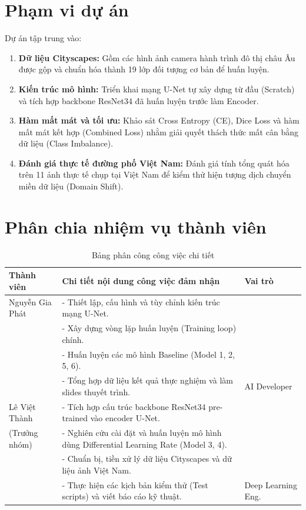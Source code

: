 \documentclass[a4paper,12pt]{report}
\begin{document}
\section{Phạm vi dự án}
Dự án tập trung vào:
\begin{enumerate}
    \item \textbf{Dữ liệu Cityscapes:} Gồm các hình ảnh camera hành trình đô thị châu Âu được gộp và chuẩn hóa thành 19 lớp đối tượng cơ bản để huấn luyện.
    \item \textbf{Kiến trúc mô hình:} Triển khai mạng U-Net tự xây dựng từ đầu (Scratch) và tích hợp backbone ResNet34 đã huấn luyện trước làm Encoder.
    \item \textbf{Hàm mất mát và tối ưu:} Khảo sát Cross Entropy (CE), Dice Loss và hàm mất mát kết hợp (Combined Loss) nhằm giải quyết thách thức mất cân bằng dữ liệu (Class Imbalance).
    \item \textbf{Đánh giá thực tế đường phố Việt Nam:} Đánh giá tính tổng quát hóa trên 11 ảnh thực tế chụp tại Việt Nam để kiểm thử hiện tượng dịch chuyển miền dữ liệu (Domain Shift).
\end{enumerate}

\section{Phân chia nhiệm vụ thành viên}
\begin{table}[H]
\centering
\caption{Bảng phân công công việc chi tiết}
\label{tab:task_assignment}
\small
\begin{tabularx}{\textwidth}{l p{8.5cm} l}
\toprule
\textbf{Thành viên} & \textbf{Chi tiết nội dung công việc đảm nhận} & \textbf{Vai trò} \\
\midrule
Nguyễn Gia Phát & - Thiết lập, cấu hình và tùy chỉnh kiến trúc mạng U-Net.\\
 & - Xây dựng vòng lặp huấn luyện (Training loop) chính.\\
 & - Huấn luyện các mô hình Baseline (Model 1, 2, 5, 6).\\
 & - Tổng hợp dữ liệu kết quả thực nghiệm và làm slides thuyết trình. & AI Developer \\
\midrule
Lê Việt Thành & - Tích hợp cấu trúc backbone ResNet34 pre-trained vào encoder U-Net.\\
(Trưởng nhóm) & - Nghiên cứu cài đặt và huấn luyện mô hình dùng Differential Learning Rate (Model 3, 4).\\
 & - Chuẩn bị, tiền xử lý dữ liệu Cityscapes và dữ liệu ảnh Việt Nam.\\
 & - Thực hiện các kịch bản kiểm thử (Test scripts) và viết báo cáo kỹ thuật. & Deep Learning Eng. \\
\bottomrule
\end{tabularx}
\end{table}
\end{document}
